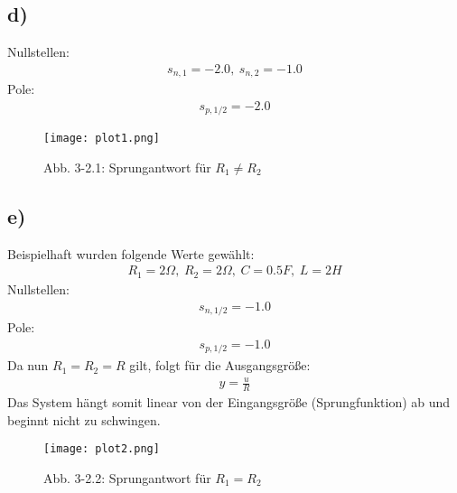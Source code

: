 \documentclass[11pt]{scrartcl} %
\begin{document}
\subsection*{d)}
Nullstellen:
\begin{align*}
	s_{n,1}=-2.0,\hspace{3pt}s_{n,2}=-1.0
\end{align*}
Pole:
\begin{align*}
	s_{p,1/2}=-2.0
\end{align*}
\begin{figure}[H]
	\centering
	\texttt{[image: plot1.png]}
	\captionsetup{labelformat=empty}
	\caption{Abb. 3-2.1: Sprungantwort für $R_1\neq R_2$}
\end{figure}
\subsection*{e)}
Beispielhaft wurden folgende Werte gewählt:
\begin{align*}
	R_1=2\Omega,\hspace{3pt}R_2=2\Omega,\hspace{3pt}C=0.5F,\hspace{3pt}L=2H
\end{align*}
Nullstellen:
\begin{align*}
	s_{n,1/2}=-1.0
\end{align*}
Pole:
\begin{align*}
	s_{p,1/2}=-1.0
\end{align*}
Da nun  $R_1=R_2=R$ gilt, folgt für die Ausgangsgröße:
\begin{align*}
	y=\frac{u}{R}
\end{align*}
Das System hängt somit linear von der Eingangsgröße (Sprungfunktion) ab und beginnt nicht zu schwingen. 
\begin{figure}[H]
	\centering
	\texttt{[image: plot2.png]}
	\captionsetup{labelformat=empty}
	\caption{Abb. 3-2.2: Sprungantwort für $R_1=R_2$}
\end{figure}
\end{document}
